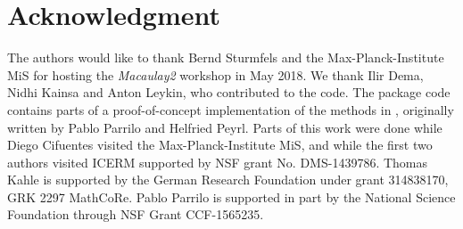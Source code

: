 \documentclass[11pt]{amsart}
\theoremstyle{plain}%
\theoremstyle{definition}
\theoremstyle{remark}
\newcommand{\Mac}{\emph{Macaulay2}\xspace}
\begin{document}
\section*{Acknowledgment}
\label{sec:acknowledgement}
The authors would like to thank Bernd Sturmfels and the Max-Planck-Institute MiS for hosting the \Mac workshop in May 2018.
We thank Ilir Dema, Nidhi Kainsa and Anton Leykin, who contributed to the code.
The package code contains parts of a proof-of-concept implementation of the methods in \cite{peyrl2008computing}, originally written by Pablo Parrilo and Helfried Peyrl.
Parts of this work were done while Diego Cifuentes visited the Max-Planck-Institute MiS, and while the first two authors visited ICERM supported by NSF grant No. DMS-1439786.
Thomas Kahle is supported by the German Research Foundation under grant 314838170, GRK 2297 MathCoRe.
Pablo Parrilo is supported in part by the National Science Foundation through NSF Grant CCF-1565235.



\end{document}
